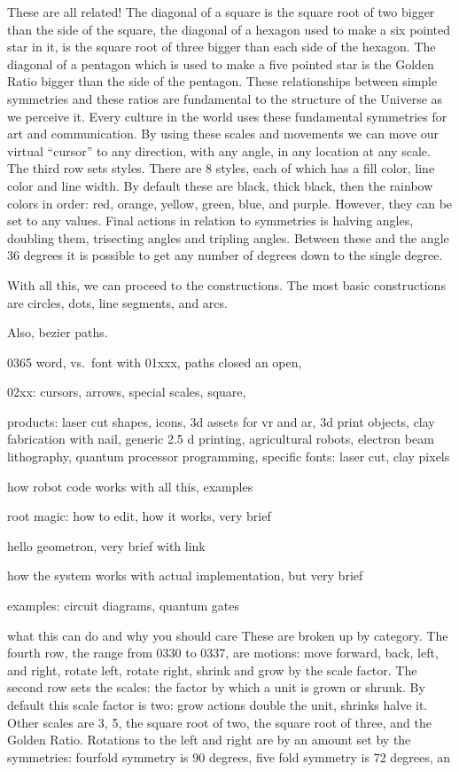 These are all related! The diagonal of a square is the square root of
two bigger than the side of the square, the diagonal of a hexagon used
to make a six pointed star in it, is the square root of three bigger
than each side of the hexagon. The diagonal of a pentagon which is used
to make a five pointed star is the Golden Ratio bigger than the side of
the pentagon. These relationships between simple symmetries and these
ratios are fundamental to the structure of the Universe as we perceive
it. Every culture in the world uses these fundamental symmetries for art
and communication. By using these scales and movements we can move our
virtual ``cursor'' to any direction, with any angle, in any location at
any scale. The third row sets styles. There are 8 styles, each of which
has a fill color, line color and line width. By default these are black,
thick black, then the rainbow colors in order: red, orange, yellow,
green, blue, and purple. However, they can be set to any values. Final
actions in relation to symmetries is halving angles, doubling them,
trisecting angles and tripling angles. Between these and the angle 36
degrees it is possible to get any number of degrees down to the single
degree.

With all this, we can proceed to the constructions. The most basic
constructions are circles, dots, line segments, and arcs.

Also, bezier paths.

0365 word, vs.~font with 01xxx, paths closed an open,

02xx: cursors, arrows, special scales, square,

products: laser cut shapes, icons, 3d assets for vr and ar, 3d print
objects, clay fabrication with nail, generic 2.5 d printing,
agricultural robots, electron beam lithography, quantum processor
programming, specific fonts: laser cut, clay pixels

how robot code works with all this, examples

root magic: how to edit, how it works, very brief

hello geometron, very brief with link

how the system works with actual implementation, but very brief

examples: circuit diagrams, quantum gates

what this can do and why you should care These are broken up by
category. The fourth row, the range from 0330 to 0337, are motions: move
forward, back, left, and right, rotate left, rotate right, shrink and
grow by the scale factor. The second row sets the scales: the factor by
which a unit is grown or shrunk. By default this scale factor is two:
grow actions double the unit, shrinks halve it. Other scales are 3, 5,
the square root of two, the square root of three, and the Golden Ratio.
Rotations to the left and right are by an amount set by the symmetries:
fourfold symmetry is 90 degrees, five fold symmetry is 72 degrees, an
